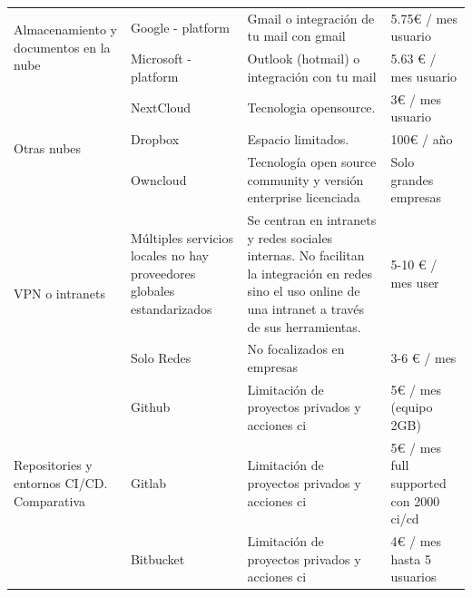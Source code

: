 \begin{center}
\begin{longtable}[!ht]{|p{3.25cm}|p{3.25cm}|p{3.25cm}|p{3.25cm}|}
\multicolumn{1}{|p{3.25cm}|}{\multirow{2}{4em}{Almacenamiento y documentos en la nube}} &
  \multicolumn{1}{p{3.25cm}|}{Google - platform} &
  \multicolumn{1}{p{3.25cm}|}{Gmail o integración de tu mail con gmail} &
  \multicolumn{1}{p{3.25cm}|}{5.75€ / mes usuario} \\ \cline{2-4} 
\multicolumn{1}{|p{3.25cm}|}{} &
  \multicolumn{1}{p{3.25cm}|}{Microsoft - platform} &
  \multicolumn{1}{p{3.25cm}|}{Outlook (hotmail) o integración con tu mail} &
  \multicolumn{1}{p{3.25cm}|}{5.63 € / mes usuario} \\ \hline
  
\multicolumn{1}{|p{3.25cm}|}{\multirow{3}{4em}{Otras nubes}} &
  \multicolumn{1}{p{3.25cm}|}{NextCloud\cite{c_nextcloud}} &
  \multicolumn{1}{p{3.25cm}|}{Tecnologia opensource.} &
  \multicolumn{1}{p{3.25cm}|}{3€ / mes usuario} \\ \cline{2-4} 
\multicolumn{1}{|p{3.25cm}|}{} &
  \multicolumn{1}{p{3.25cm}|}{Dropbox\cite{c_dropbox}} &
  \multicolumn{1}{p{3.25cm}|}{Espacio limitados.} &
  \multicolumn{1}{p{3.25cm}|}{100€ / año} \\ \cline{2-4} 
\multicolumn{1}{|p{3.25cm}|}{} &
  \multicolumn{1}{p{3.25cm}|}{Owncloud\cite{c_owncloud}} &
  \multicolumn{1}{p{3.25cm}|}{Tecnología open source community y versión enterprise licenciada} &
  \multicolumn{1}{p{3.25cm}|}{Solo grandes empresas} \\ \hline
  
\multicolumn{1}{|p{3.25cm}|}{\multirow{2}{4em}{VPN o intranets}} &
  \multicolumn{1}{p{3.25cm}|}{Múltiples servicios locales no hay proveedores globales estandarizados} &
  \multicolumn{1}{p{3.25cm}|}{Se centran en intranets y redes sociales internas. No facilitan la integración en redes sino el uso online de una intranet a través de sus herramientas.} &
  \multicolumn{1}{p{3.25cm}|}{5-10 € / mes user} \\ \cline{2-4} 
\multicolumn{1}{|p{3.25cm}|}{} &
  \multicolumn{1}{p{3.25cm}|}{Solo Redes} &
  \multicolumn{1}{p{3.25cm}|}{No focalizados en empresas} &
  \multicolumn{1}{p{3.25cm}|}{3-6 € / mes} \\ \hline
  
\multicolumn{1}{|p{3.25cm}|}{\multirow{3}{4em}{Repositories y entornos CI/CD. Comparativa \cite{c_repository_comparative}}} &
  \multicolumn{1}{p{3.25cm}|}{Github\cite{c_github}} &
  \multicolumn{1}{p{3.25cm}|}{Limitación de proyectos privados y acciones ci} &
  \multicolumn{1}{p{3.25cm}|}{5€ / mes (equipo 2GB)} \\ \cline{2-4} 
\multicolumn{1}{|p{3.25cm}|}{} &
  \multicolumn{1}{p{3.25cm}|}{Gitlab\cite{c_gitlab}} &
  \multicolumn{1}{p{3.25cm}|}{Limitación de proyectos privados y acciones ci} &
  \multicolumn{1}{p{3.25cm}|}{5€ / mes full supported con 2000 ci/cd} \\ \cline{2-4} 
\multicolumn{1}{|p{3.25cm}|}{} &
  \multicolumn{1}{p{3.25cm}|}{Bitbucket\cite{c_bitbucket}} &
  \multicolumn{1}{p{3.25cm}|}{Limitación de proyectos privados y acciones ci} &
  \multicolumn{1}{p{3.25cm}|}{4€ / mes hasta 5 usuarios} \\ \hline
  

\end{longtable}
\end{center}
